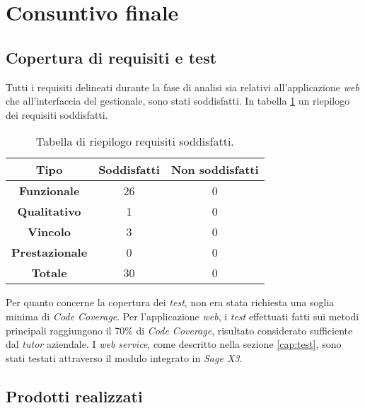 
\section{Consuntivo finale}

\subsection{Copertura di requisiti e test}

Tutti i requisiti delineati durante la fase di analisi sia relativi all'applicazione \textit{web} che all'interfaccia del gestionale, sono stati soddisfatti. In tabella \ref{table:requisiti-soddisfatti} un riepilogo dei requisiti soddisfatti.

\begin{center}
	\begin{longtable}{ | c| c | c|}
		\caption{Tabella di riepilogo requisiti soddisfatti.}
		\label{table:requisiti-soddisfatti}\\		
		\hline
		\textbf{Tipo} & \textbf{Soddisfatti} & \textbf{Non soddisfatti} \\
		\hline
		\textbf{Funzionale} & 26 & 0 \\
		\hline
		\textbf{Qualitativo} & 1 & 0 \\
		\hline
		\textbf{Vincolo} & 3 & 0 \\
		\hline
		\textbf{Prestazionale} & 0 & 0 \\
		\hline
		\textbf{Totale} & 30 & 0 \\
		\hline
	\end{longtable}
\end{center}


Per quanto concerne la copertura dei \textit{test}, non era stata richiesta una soglia minima di \textit{Code Coverage}. Per l'applicazione \textit{web}, i \textit{test} effettuati fatti sui metodi principali raggiungono il 70\% di \textit{Code Coverage}, risultato considerato sufficiente dal \textit{tutor} aziendale.
I \textit{web service}, come descritto nella sezione \ref{cap:test}, sono stati testati attraverso il modulo integrato in \textit{Sage X3}.


\newpage

\subsection{Prodotti realizzati}


